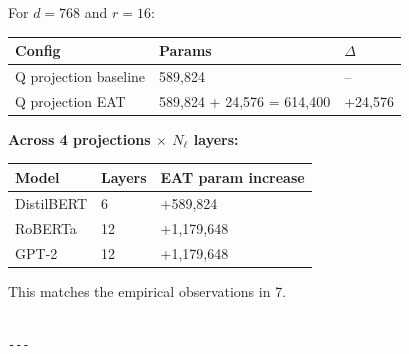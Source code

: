 For $d = 768$ and $r = 16$:

\begin{table}[H]
\centering
\small
\begin{tabular}{lll}
\toprule
\textbf{Config} & \textbf{Params} & \textbf{$\Delta$} \\
\midrule
Q projection baseline & 589,824 & -- \\
Q projection EAT & 589,824 + 24,576 = 614,400 & +24,576 \\
\bottomrule
\end{tabular}
\end{table}

\textbf{Across 4 projections $\times$ $N_\ell$ layers:}

\begin{table}[H]
\centering
\small
\begin{tabular}{lll}
\toprule
\textbf{Model} & \textbf{Layers} & \textbf{EAT param increase} \\
\midrule
DistilBERT & 6 & +589,824 \\
RoBERTa & 12 & +1,179,648 \\
GPT-2 & 12 & +1,179,648 \\
\bottomrule
\end{tabular}
\end{table}

This matches the empirical observations in  7.
\begin{lstlisting}

---
\end{lstlisting}